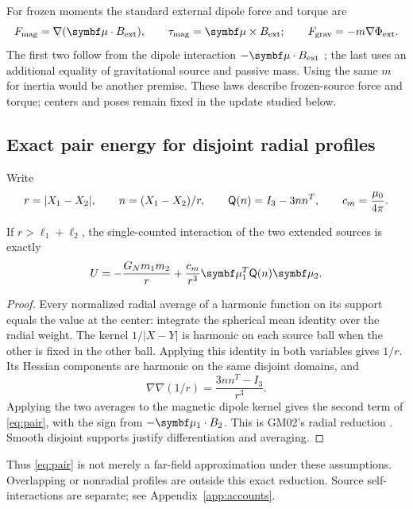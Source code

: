 For frozen moments the standard external dipole force and torque are
\begin{equation}
 F_{\rm mag}=\nabla(\mub\cdot B_{\rm ext}),\qquad
 \tau_{\rm mag}=\mub\times B_{\rm ext};\qquad
 F_{\rm grav}=-m\nabla\Phi_{\rm ext}. \label{eq:force}
\end{equation}
The first two follow from the dipole interaction \(-\mub\cdot B_{\rm ext}\) \cite{TongM}; the last uses an additional equality of gravitational source and passive mass. Using the same \(m\) for inertia would be another premise. These laws describe frozen-source force and torque; centers and poses remain fixed in the update studied below.

\subsection{Exact pair energy for disjoint radial profiles}
Write
\[
 r=|X_1-X_2|,\qquad n=(X_1-X_2)/r,\qquad
 \mathsf Q(n)=I_3-3nn^T,\qquad c_m=\frac{\mu_0}{4\pi}.
\]
\begin{proposition}\label{prop:radial}
If \(r>\ell_1+\ell_2\), the single-counted interaction of the two extended sources is exactly
\begin{equation}
 U=-\frac{G_Nm_1m_2}{r}+\frac{c_m}{r^3}\mub_1^T\Q(n)\mub_2.
 \label{eq:pair}
\end{equation}
\end{proposition}
\begin{proof}
Every normalized radial average of a harmonic function on its support equals the value at the center: integrate the spherical mean identity over the radial weight. The kernel \(1/|X-Y|\) is harmonic on each source ball when the other is fixed in the other ball. Applying this identity in both variables gives \(1/r\). Its Hessian components are harmonic on the same disjoint domains, and
\[
 \nabla\nabla(1/r)=\frac{3nn^T-I_3}{r^3}.
\]
Applying the two averages to the magnetic dipole kernel gives the second term of \eqref{eq:pair}, with the sign from \(-\mub_1\cdot B_2\). This is GM02's radial reduction \cite{GM02}. Smooth disjoint supports justify differentiation and averaging.
\end{proof}
Thus \eqref{eq:pair} is not merely a far-field approximation under these assumptions. Overlapping or nonradial profiles are outside this exact reduction. Source self-interactions are separate; see Appendix~\ref{app:accounts}.

